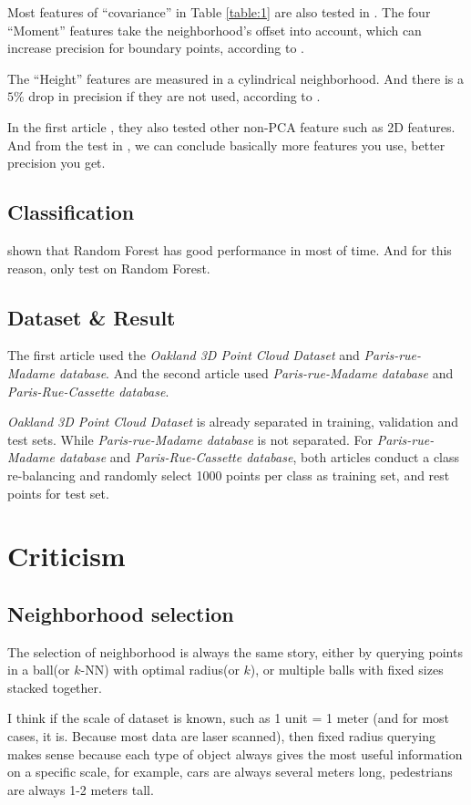 \documentclass{article}
\begin{document}
Most features of ``covariance'' in Table \ref{table:1} are also tested in \cite{weinmann2015}. The four ``Moment'' features take the neighborhood's offset into account, which can increase precision for boundary points, according to \cite{hackel2016fast}.

The ``Height'' features are measured in a cylindrical neighborhood. And there is a $5\%$ drop in precision if they are not used, according to \cite{hackel2016fast}.

In the first article \cite{weinmann2015}, they also tested other non-PCA feature such as 2D features. And from the test in \cite{weinmann2015}, we can conclude basically more features you use, better precision you get. 
\subsection{Classification}
\cite{weinmann2015} shown that Random Forest has good performance in most of time. And for this reason, \cite{hackel2016fast} only test on Random Forest.

\subsection{Dataset \& Result}
The first article \cite{weinmann2015} used the \textit{Oakland 3D Point Cloud Dataset} and \textit{Paris-rue-Madame database}. And the second article used \textit{Paris-rue-Madame database} and \textit{Paris-Rue-Cassette database}.

\textit{Oakland 3D Point Cloud Dataset} is already separated in training, validation and test sets. While \textit{Paris-rue-Madame database} is not separated. For \textit{Paris-rue-Madame database} and \textit{Paris-Rue-Cassette database}, both articles conduct a class re-balancing and randomly select 1000 points per class as training set, and rest points for test set.

\section{Criticism}
\subsection{Neighborhood selection}\label{sec:nb}
The selection of neighborhood is always the same story, either by querying points in a ball(or $k$-NN) with optimal radius(or $k$), or multiple balls with fixed sizes stacked together.

I think if the scale of dataset is known, such as 1 unit = 1 meter (and for most cases, it is. Because most data are laser scanned), then fixed radius querying makes sense because each type of object always gives the most useful information on a specific scale, for example, cars are always several meters long, pedestrians are always 1-2 meters tall.
\end{document}
